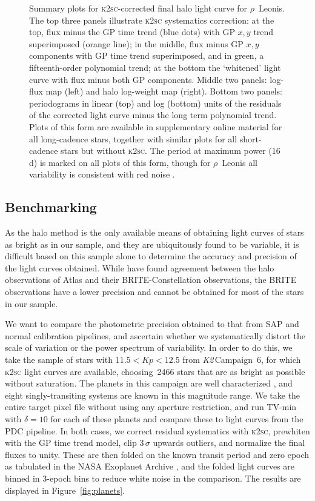 \documentclass[modern]{aastex62}
\newcommand\ktwo{\emph{K2}\,}
\begin{document}
\begin{figure*}
\caption{Summary plots for \textsc{k2sc}-corrected final halo light curve for $\rho$~Leonis. The top three panels illustrate \textsc{k2sc} systematics correction: at the top, flux minus the GP time trend (blue dots) with GP $x,y$ trend superimposed (orange line); in the middle, flux minus GP $x,y$ components with GP time trend superimposed, and in green, a fifteenth-order polynomial trend; at the bottom the `whitened' light curve with flux minus both GP components. Middle two panels: log-flux map (left) and halo log-weight map (right). Bottom two panels: periodograms in linear (top) and log (bottom) units of the residuals of the corrected light curve minus the long term polynomial trend. Plots of this form are available in supplementary online material for all long-cadence stars, together with similar plots for all short-cadence stars but without \textsc{k2sc}. The period at maximum power (16\,d) is marked on all plots of this form, though for $\rho$~Leonis all variability is consistent with red noise \citep{Aerts2018,bowman19}.}
\label{fig:rholeo}
\end{figure*}

\subsection{Benchmarking}
\label{sec:benchmarking}

As the halo method is the only available means of obtaining light curves of stars as bright as in our sample, and they are ubiquitously found to be variable, it is difficult based on this sample alone to determine the accuracy and precision of the light curves obtained. While \citet{Kallinger2018} have found agreement between the \citet{White2017} halo observations of Atlas and their BRITE-Constellation observations, the BRITE observations have a lower precision and cannot be obtained for most of the stars in our sample. 

We want to compare the photometric precision obtained to that from SAP and normal calibration pipelines, and ascertain whether we systematically distort the scale of variation or the power spectrum of variability. In order to do this, we take the sample of stars with $11.5 <  Kp < 12.5$ from \ktwo Campaign~6, for which \textsc{k2sc} light curves are available, choosing~2466 stars that are as bright as possible without saturation. The planets in this campaign are well characterized \citep[e.g.][]{Pope2016planets}, and eight singly-transiting systems are known in this magnitude range. We take the entire target pixel file without using any aperture restriction, and run TV-min with $\delta = 10$ for each of these planets and compare these to light curves from the PDC pipeline. In both cases, we correct residual systematics with \textsc{k2sc}, prewhiten with the GP time trend model, clip $3\,\sigma$ upwards outliers, and normalize the final fluxes to unity. These are then folded on the known transit period and zero epoch as tabulated in the NASA Exoplanet Archive \citep{2013PASP..125..989A}, and the folded light curves are binned in 3-epoch bins to reduce white noise in the comparison. The results are displayed in Figure~\ref{fig:planets}.
\end{document}
